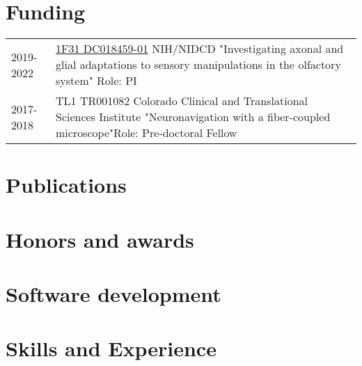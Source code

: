 \documentclass[11pt]{article}
\begin{document}
\section*{Funding}
\label{sec:org42d80d3}

\begin{tabular}{lp{}}
2019-2022& \href{https://projectreporter.nih.gov/project_info_details.cfm?aid=9909888&icde=50328886&ddparam=&ddvalue=&ddsub=&cr=1&csb=default&cs=ASC&pball=}{1F31 DC018459-01} \newline NIH/NIDCD \newline "Investigating axonal and glial adaptations to sensory manipulations in the olfactory system" \newline Role: PI \\
2017-2018& TL1 TR001082 \newline Colorado Clinical and Translational Sciences Institute \newline "Neuronavigation with a fiber-coupled microscope"\newline Role: Pre-doctoral Fellow
\end{tabular}

\section*{Publications}
\label{sec:orgd6a04a0}

\section*{Honors and awards}
\label{sec:org0a8e43d}
\section*{Software development}
\label{sec:orgd6521a5}
\section*{Skills and Experience}
\label{sec:org740d876}
\end{document}

